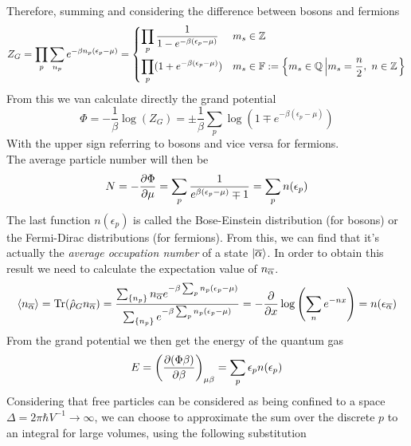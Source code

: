 \documentclass[../qm.tex]{subfiles}
\begin{document}
	Therefore, summing and considering the difference between bosons and fermions
	\begin{equation}
		Z_G=\prod_p\sum_{n_p}e^{-\beta n_p(\epsilon_p-\mu)}=
			\begin{dcases}
				\prod_p\frac{1}{1-e^{-\beta(\epsilon_p-\mu)}}&m_s\in\mathbb{Z}\\
				\prod_p(1+e^{-\beta(\epsilon_p-\mu)})&m_s\in\mathbb{F}:=\left\{m_s\in\mathbb{Q}\left|m_s=\frac{n}{2},\ n\in\mathbb{Z}\right.\right\}
			\end{dcases}
		\label{eq:idealqgasgrandcanon}
	\end{equation}
	From this we van calculate directly the grand potential
	\begin{equation}
		\Phi=-\frac{1}{\beta}\log(Z_G)=\pm\frac{1}{\beta}\sum_p\log\left( 1\mp e^{-\beta(\epsilon_p-\mu)} \right)
		\label{eq:grandpotential}
	\end{equation}
	With the upper sign referring to bosons and vice versa for fermions.\\
	The average particle number will then be
	\begin{equation}
		N=-\pdv{\Phi}{\mu}=\sum_p\frac{1}{e^{\beta(\epsilon_p-\mu)}\mp1}=\sum_pn(\epsilon_p)
		\label{eq:averageparticlenumberiqg}
	\end{equation}
	The last function $n(\epsilon_p)$ is called the Bose-Einstein distribution (for bosons) or the Fermi-Dirac distributions (for fermions). From this, we can find that it's actually the \textit{average occupation number} of a state $\ket{\overline{\alpha}}$. In order to obtain this result we need to calculate the expectation value of $n_{\overline{\alpha}}$.
	\begin{equation}
		\expval{n_{\overline{\alpha}}}=\mathrm{Tr}(\hat{\rho}_Gn_{\overline{\alpha}})=\frac{\sum_{\{n_p\}}n_{\overline{\alpha}}e^{-\beta\sum_pn_p(\epsilon_p-\mu)}}{\sum_{\{n_p\}}e^{-\beta\sum_pn_p(\epsilon_p-\mu)}}=-\pdv{x}\log\left( \sum_ne^{-nx} \right)=n(\epsilon_{\overline{\alpha}})
		\label{eq:avgoccn}
	\end{equation}
	From the grand potential we then get the energy of the quantum gas
	\begin{equation}
		E=\left( \pdv{(\Phi\beta)}{\beta} \right)_{\mu\beta}=\sum_p\epsilon_pn(\epsilon_p)
		\label{eq:internalenergy}
	\end{equation}
	Considering that free particles can be considered as being confined to a space $\Delta=2\pi\hbar V^{-1}\to\infty$, we can choose to approximate the sum over the discrete $p$ to an integral for large volumes, using the following substitution
\end{document}
